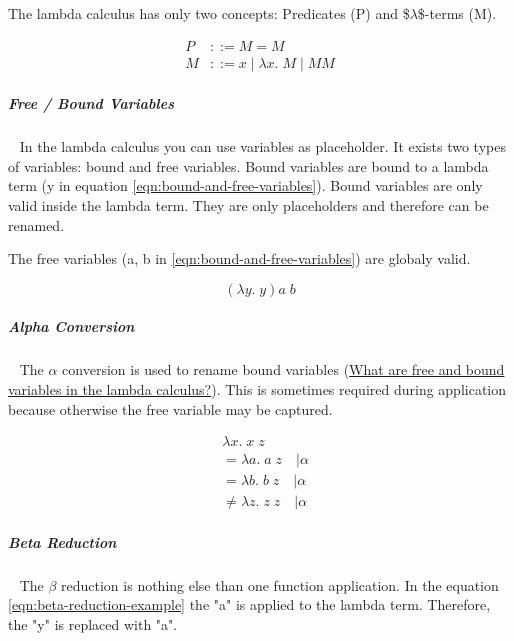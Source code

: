 \documentclass[11pt,twoside,landscape]{article}
\begin{document}
\begin{multicols}{3}
The lambda calculus has only two concepts: Predicates (P) and \$\(\lambda\)\$-terms (M).

\begin{equation}
  \begin{align}
    \label{eqn:syntax-of-lc}
    P &::= M = M \\
    M &::= x \; | \; \lambda x . \; M \; | \; M M
  \end{align}
\end{equation}

\subparagraph{Free / Bound Variables} \
\label{sec:org89f4dc7}
In the lambda calculus you can use variables as placeholder.
It exists two types of variables: bound and free variables.
Bound variables are bound to a lambda term (y in equation \eqref{eqn:bound-and-free-variables}).
Bound variables are only valid inside the lambda term.
They are only placeholders and therefore can be renamed.

The free variables (a, b in \eqref{eqn:bound-and-free-variables}) are globaly valid.


\begin{equation}
  \label{eqn:bound-and-free-variables}
  (\lambda y. \; y) a \; b
\end{equation}


\subparagraph{Alpha Conversion} \
\label{sec:org65bae8d}
The \(\alpha\) conversion is used to rename bound variables (\href{../../../roam/20220616081515-what_are_free_and_bound_variables_in_the_lambda_calculs.org}{What are free and bound variables in the lambda calculus?}).
This is sometimes required during application because otherwise the free variable may be captured.

\begin{equation}
  \label{eqn:example-alpha-conversion}
  \begin{align}
    &\lambda x. \; x \; z \\
    &= \lambda a. \; a \; z \quad | \alpha \\
    &= \lambda b. \; b \; z \quad | \alpha \\
    & \ne \lambda z. \; z \; z \quad | \alpha
  \end{align}
\end{equation}

\subparagraph{Beta Reduction} \
\label{sec:orgeba6760}
The \(\beta\) reduction is nothing else than one function application.
In the equation \eqref{eqn:beta-reduction-example} the "a" is applied to the lambda term.
Therefore, the "y" is replaced with "a".


\end{multicols}
\end{document}
